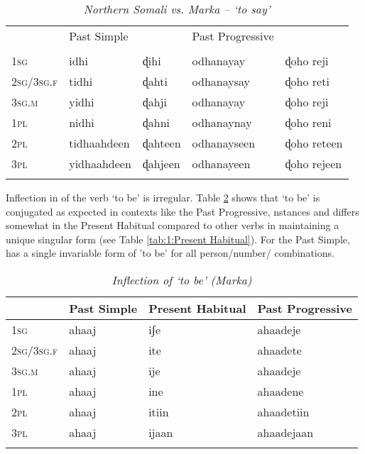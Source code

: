 \documentclass[output=paper]{LSP/langsci}
\begin{document}
 \begin{table}
 	\caption{\textit{Northern Somali vs. Marka -- `to say'}}
 	\label{tab:1:Irregular Verbs}
 	\begin{tabularx}{\textwidth}{Xllll} 
 		\lsptoprule
 		& Past Simple   &   & Past Progressive &    \\
 		& \ili{Somali} & \ili{Marka} & \ili{Somali} & \ili{Marka} \\ 
 		\midrule
 		1\textsc{sg} & idhi & ɖihi & odhanayay & ɖoho reji \\
 		2\textsc{sg}/3\textsc{sg.f} & tidhi  & ɖahti & odhanaysay  & ɖoho reti  \\
 		3\textsc{sg.m} & yidhi & ɖahji & odhanayay & ɖoho reji \\
 		1\textsc{pl} & nidhi & ɖahni & odhanaynay & ɖoho reni \\
 		2\textsc{pl} & tidhaahdeen & ɖahteen & odhanayseen & ɖoho reteen \\
 		3\textsc{pl} & yidhaahdeen & ɖahjeen & odhanayeen & ɖoho rejeen \\
 		\lspbottomrule
 	\end{tabularx}
 \end{table}
 
 Inflection in  of the verb  `to be' is irregular. Table \ref{tab:1:ToBe} shows that `to be' is conjugated as expected in  contexts like the Past Progressive, nstances and differs somewhat in the Present Habitual compared to other verbs in maintaining a unique  singular  form (see Table \ref{tab:1:Present Habitual}). For the Past Simple,  has a single invariable form of 'to be' for all person/number/ combinations.
 
  \begin{table}
 	\caption{\textit{Inflection of `to be' (Marka)}}
 	\label{tab:1:ToBe}
 	\begin{tabularx}{\textwidth}{Xlll} 
 		\lsptoprule
 		& Past Simple   &  Present Habitual & Past Progressive    \\  
 		\midrule
 		1\textsc{sg} & ahaaj & iʃe & ahaadeje \\
 		2\textsc{sg}/3\textsc{sg.f} & ahaaj  & ite & ahaadete   \\
 		3\textsc{sg.m} & ahaaj & ije & ahaadeje  \\
 		1\textsc{pl} & ahaaj & ine & ahaadene  \\
 		2\textsc{pl} & ahaaj & itiin & ahaadetiin  \\
 		3\textsc{pl} & ahaaj & ijaan & ahaadejaan \\
 		\lspbottomrule
 	\end{tabularx}
 \end{table}
 
\end{document}
